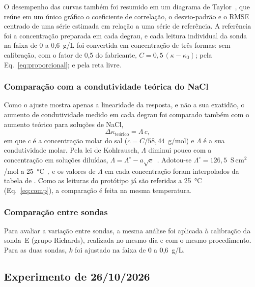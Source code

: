 \documentclass[12pt,a4paper]{article}
\begin{document}
O desempenho das curvas também foi resumido em um diagrama de Taylor~\cite{taylor2001}, que reúne em um único gráfico o coeficiente de correlação, o desvio-padrão e o RMSE centrado de uma série estimada em relação a uma série de referência. A referência foi a concentração preparada em cada degrau, e cada leitura individual da sonda na faixa de 0 a 0,6~g/L foi convertida em concentração de três formas: sem calibração, com o fator de 0,5 do fabricante, $C = 0{,}5\,(\kappa - \kappa_0)$; pela Eq.~\eqref{eq:proporcional}; e pela reta livre.

\subsubsection{Comparação com a condutividade teórica do NaCl}

Como o ajuste mostra apenas a linearidade da resposta, e não a sua exatidão, o aumento de condutividade medido em cada degrau foi comparado também com o aumento teórico para soluções de NaCl,
\begin{equation}
  \Delta\kappa_{\text{teórico}} = \Lambda\,c,
  \label{eq:kohlrausch}
\end{equation}
em que $c$ é a concentração molar do sal ($c = C/58{,}44$~g/mol) e $\Lambda$ é a sua condutividade molar. Pela lei de Kohlrausch, $\Lambda$ diminui pouco com a concentração em soluções diluídas, $\Lambda = \Lambda^\circ - a\sqrt{c}$~\cite{miller1988}. Adotou-se $\Lambda^\circ = 126{,}5$~S\,cm$^2$/mol a 25~°C~\cite{wu1995}, e os valores de $\Lambda$ em cada concentração foram interpolados da tabela de . Como as leituras do protótipo já são referidas a 25~°C (Eq.~\eqref{eq:comp}), a comparação é feita na mesma temperatura.

\subsubsection{Comparação entre sondas}

Para avaliar a variação entre sondas, a mesma análise foi aplicada à calibração da sonda~E (grupo Richards), realizada no mesmo dia e com o mesmo procedimento. Para as duas sondas, $k$ foi ajustado na faixa de 0 a 0,6~g/L.


\subsection{Experimento de 26/10/2026}
\label{sec:met_exp2610}
\end{document}
